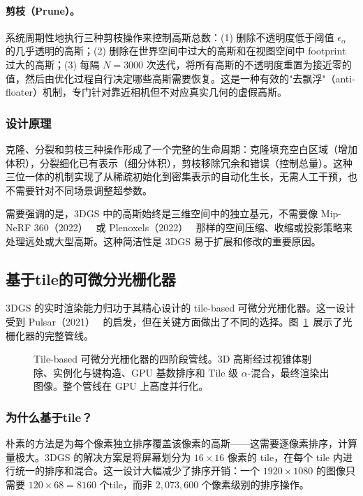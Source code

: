 \paragraph{剪枝（Prune）。} 系统周期性地执行三种剪枝操作来控制高斯总数：(1) 删除不透明度低于阈值 $\epsilon_\alpha$ 的几乎透明的高斯；(2) 删除在世界空间中过大的高斯和在视图空间中 footprint 过大的高斯；(3) 每隔 $N = 3000$ 次迭代，将所有高斯的不透明度重置为接近零的值，然后由优化过程自行决定哪些高斯需要恢复。这是一种有效的"去飘浮"（anti-floater）机制，专门针对靠近相机但不对应真实几何的虚假高斯。

\subsubsection{设计原理}

克隆、分裂和剪枝三种操作形成了一个完整的生命周期：克隆填充空白区域（增加体积），分裂细化已有表示（细分体积），剪枝移除冗余和错误（控制总量）。这种三位一体的机制实现了从稀疏初始化到密集表示的自动化生长，无需人工干预，也不需要针对不同场景调整超参数。

需要强调的是，3DGS 中的高斯始终是三维空间中的独立基元，不需要像 Mip-NeRF 360（2022）~\cite{barron2022mipnerf360} 或 Plenoxels（2022）~\cite{plenoxels} 那样的空间压缩、收缩或投影策略来处理远处或大型高斯。这种简洁性是 3DGS 易于扩展和修改的重要原因。

\subsection{基于tile的可微分光栅化器}
\label{sec:01_1_5}

3DGS 的实时渲染能力归功于其精心设计的 tile-based 可微分光栅化器。这一设计受到 Pulsar（2021）~\cite{Lassner_2021_CVPR} 的启发，但在关键方面做出了不同的选择。图~\ref{fig:01_rasterizer}~展示了光栅化器的完整管线。

\begin{figure}[htbp]
\centering
\resizebox{0.95\textwidth}{!}{}
\caption{Tile-based 可微分光栅化器的四阶段管线。3D 高斯经过视锥体剔除、实例化与键构造、GPU 基数排序和 Tile 级 $\alpha$-混合，最终渲染出图像。整个管线在 GPU 上高度并行化。}
\label{fig:01_rasterizer}
\end{figure}

\subsubsection{为什么基于tile？}

朴素的方法是为每个像素独立排序覆盖该像素的高斯——这需要逐像素排序，计算量极大。3DGS 的解决方案是将屏幕划分为 $16 \times 16$ 像素的 tile，在每个 tile 内进行统一的排序和混合。这一设计大幅减少了排序开销：一个 $1920 \times 1080$ 的图像只需要 $120 \times 68 = 8160$ 个tile，而非 $2{,}073{,}600$ 个像素级别的排序操作。

